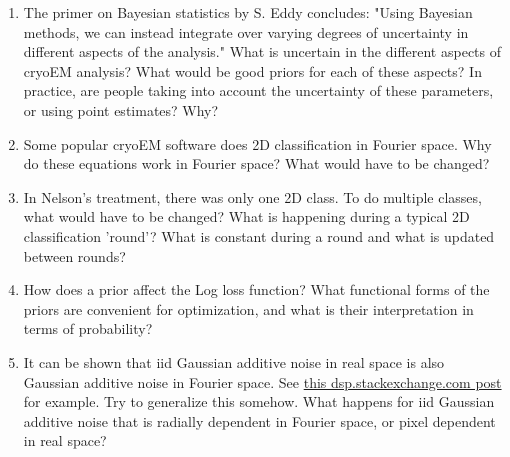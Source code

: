 \documentclass[11pt, oneside]{article}   	%
\begin{document}
\begin{enumerate}
	\item The primer on Bayesian statistics by S. Eddy concludes: "Using Bayesian methods, we can instead integrate over varying degrees of uncertainty in different aspects of the analysis." What is uncertain in the different aspects of cryoEM analysis? What would be good priors for each of these aspects? In practice, are people taking into account the uncertainty of these parameters, or using point estimates? Why?
	\item Some popular cryoEM software does 2D classification in Fourier space. Why do these equations work in Fourier space? What would have to be changed?
	\item In Nelson's treatment, there was only one 2D class. To do multiple classes, what would have to be changed? What is happening during a typical 2D classification 'round'? What is constant during a round and what is updated between rounds?
	\item How does a prior affect the Log loss function? What functional forms of the priors are convenient for optimization, and what is their interpretation in terms of probability?
	\item It can be shown that iid Gaussian additive noise in real space is also Gaussian additive noise in Fourier space. See \href{https://dsp.stackexchange.com/questions/24170/what-are-the-statistics-of-the-discrete-fourier-transform-of-white-gaussian-nois}{this dsp.stackexchange.com post} for example. Try to generalize this somehow. What happens for iid Gaussian additive noise that is radially dependent in Fourier space, or pixel dependent in real space?
\end{enumerate}

\pagebreak
\end{document}
